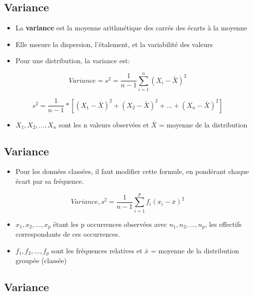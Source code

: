 \documentclass[
]{article}
\providecommand{\tightlist}{%
  \setlength{\itemsep}{0pt}\setlength{\parskip}{0pt}}
\begin{document}
\hypertarget{variance}{%
\subsection{Variance}\label{variance}}

\begin{itemize}
\tightlist
\item
  La \textbf{variance} est la moyenne arithmétique des carrés des écarts
  à la moyenne
\item
  Elle mesure la dispersion, l'étalement, et la variabilité des valeurs
\item
  Pour une distribution, la variance est:
\end{itemize}

\[Variance = s^2 = \frac{1}{n-1} \sum_{i=1}^n (X_i - \bar{X})^2\]

\[s^2 = \frac{1}{n-1} *[(X_1 - \bar{X})^2 + (X_2 - \bar{X})^2 + ... + (X_n - \bar{X})^2]\]

\begin{itemize}
\tightlist
\item
  \(X_1, X_2, ... , X_n\) sont les n valeurs observées et \(\bar{X}\) =
  moyenne de la distribution
\end{itemize}

\hypertarget{variance-1}{%
\subsection{Variance}\label{variance-1}}

\begin{itemize}
\tightlist
\item
  Pour les données classées, il faut modifier cette formule, en
  pondérant chaque écart par sa fréquence.
\end{itemize}

\[Variance, s^2 = \frac{1}{n-1} \sum_{i=1}^p f_i(x_i - \bar{x})^2\]

\begin{itemize}
\item
  \(x_1, x_2, ... , x_p\) étant les p occurrences observées avec
  \(n_1, n_2, ... , n_p\), les effectifs correspondants de ces
  occurrences.
\item
  \(f_1, f_2, ... , f_p\) sont les fréquences relatives et \(\bar{x}\) =
  moyenne de la distribution groupée (classée)
\end{itemize}

\hypertarget{variance-2}{%
\subsection{Variance}\label{variance-2}}
\end{document}
